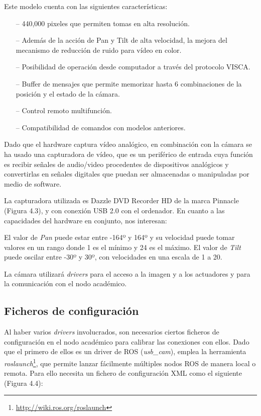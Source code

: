\vspace{4.0cm}
Este modelo cuenta con las siguientes características:
\begin{itemize}
	\item[--] 440,000 pixeles que permiten tomas en alta resolución.
	\item[--] Además de la acción de Pan y Tilt de alta velocidad, la mejora del mecanismo de reducción de ruido para vídeo en color. 
	\item[--] Posibilidad de operación desde computador a través del protocolo VISCA.
	\item[--] Buffer de mensajes que permite memorizar hasta 6 combinaciones de la posición y el estado de la cámara. 
	\item[--] Control remoto multifunción. 
	\item[--] Compatibilidad de comandos con modelos anteriores.
\end{itemize}

Dado que el hardware captura vídeo analógico, en combinación con la cámara se ha usado una capturadora de vídeo, que es un periférico de entrada cuya función es recibir señales de audio/video procedentes de dispositivos analógicos y convertirlas en señales digitales que puedan ser almacenadas o manipuladas por medio de software.

La capturadora utilizada es Dazzle DVD Recorder HD de la marca Pinnacle (Figura 4.3), y con conexión USB 2.0 con el ordenador. En cuanto a las capacidades del hardware en conjunto, nos interesan:

El valor de \textit{Pan} puede estar entre -164º y 164º y su velocidad puede tomar valores en un rango donde 1 es el mínimo y 24 es el máximo. El valor de \textit{Tilt} puede oscilar entre -30º y  30º, con velocidades en una escala de 1 a 20.

La cámara utilizará \textit{drivers} para el acceso a la imagen y a los actuadores y para la comunicación con el nodo académico.

\subsection{Ficheros de configuración}
Al haber varios \textit{drivers} involucrados, son necesarios ciertos ficheros de configuración en el nodo académico para calibrar las conexiones con ellos. Dado que el primero de ellos es un driver de ROS (\textit{usb\_cam}), emplea la herramienta \textit{roslaunch}\footnote{\url{http://wiki.ros.org/roslaunch}}, que permite lanzar fácilmente múltiples nodos ROS de manera local o remota. Para ello necesita un fichero de configuración XML como el siguiente (Figura 4.4): 

